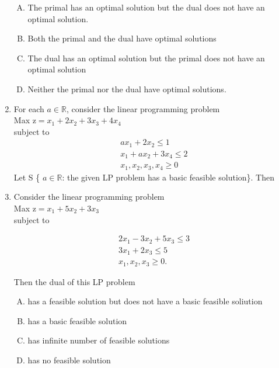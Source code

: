 \documentclass[journal,12pt,twocolumn]{IEEEtran}
\begin{document}
\begin{enumerate}
\begin{enumerate}[(A)]
\setlength\itemsep{1em}
\item The primal has an optimal solution but the dual does not have an optimal solution.
\item Both the primal and the dual have optimal solutions
\item The dual has an optimal solution but the primal does not have an optimal solution
\item Neither the primal nor the dual have optimal solutions.
\end{enumerate}

\item For each $a \! \in \! \mathbb{R}$, consider the linear programming problem \\
Max $\text{z} \! = \! x_1 + \! 2x_2 \! + \! 3x_3 \! + \! 4x_4$\\
subject to 
\begin{align*}
ax_1 \! + \! 2x_2 \! \leqslant \! 1 \\
x_1 \! + \! ax_2 \! + \! 3x_4 \! \leqslant \! 2 \\
x_1, \! x_2, \! x_3, \! x_4 \! \geqslant \! 0 
\end{align*}
Let S \{ $a \! \in \! \mathbb{R}$: the given LP problem has a basic feasible solution\}. Then 
\begin{enumerate}[(A)]
\end{enumerate}

\item Consider the linear programming problem \\
Max $\text{z} \! = \! x_1 \! + \! 5x_2 \! + \! 3x_3$ \\
subject to \\
\begin{center}
\begin{align*}
2x_1 \! - \! 3x_2 \! + \! 5x_3 \! \leqslant \! 3 \\
3x_1 \! + \! 2x_3 \! \leqslant \! 5 \\
x_1, \! x_2, \! x_3 \! \geqslant \! 0.
\end{align*}
\end{center}
Then the dual of this LP problem 
\begin{enumerate}[(A)]
\setlength\itemsep{1em}
\item has a feasible solution but does not have a basic feasible soliution
\item has a basic feasible solution
\item has infinite number of feasible solutions
\item has no feasible solution
\end{enumerate}


\end{enumerate}
\end{document}
